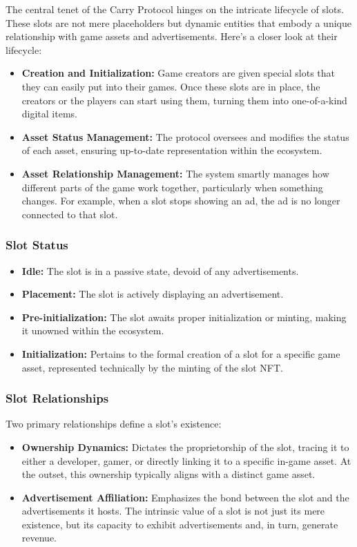 The central tenet of the Carry Protocol hinges on the intricate lifecycle of slots. These slots are not mere placeholders but dynamic entities that embody a unique relationship with game assets and advertisements. Here's a closer look at their lifecycle:

\begin{itemize}
    \item \textbf{Creation and Initialization:} Game creators are given special slots that they can easily put into their games. Once these slots are in place, the creators or the players can start using them, turning them into one-of-a-kind digital items. 
    \item \textbf{Asset Status Management:} The protocol oversees and modifies the status of each asset, ensuring up-to-date representation within the ecosystem.
    \item \textbf{Asset Relationship Management:} The system smartly manages how different parts of the game work together, particularly when something changes. For example, when a slot stops showing an ad, the ad is no longer connected to that slot.
\end{itemize}


\subsubsection{Slot Status}
\begin{itemize}
    \item \textbf{Idle:} The slot is in a passive state, devoid of any advertisements.
    \item \textbf{Placement:} The slot is actively displaying an advertisement.
    \item \textbf{Pre-initialization:} The slot awaits proper initialization or minting, making it unowned within the ecosystem.
    \item \textbf{Initialization:} Pertains to the formal creation of a slot for a specific game asset, represented technically by the minting of the slot NFT.
\end{itemize}

\subsubsection{Slot Relationships}
Two primary relationships define a slot's existence:
\begin{itemize}
    \item \textbf{Ownership Dynamics:} Dictates the proprietorship of the slot, tracing it to either a developer, gamer, or directly linking it to a specific in-game asset. At the outset, this ownership typically aligns with a distinct game asset.
    \item \textbf{Advertisement Affiliation:} Emphasizes the bond between the slot and the advertisements it hosts. The intrinsic value of a slot is not just its mere existence, but its capacity to exhibit advertisements and, in turn, generate revenue.
\end{itemize}

